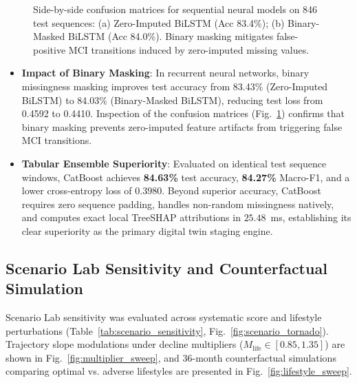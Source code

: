 \documentclass[11pt,a4paper]{article}
\begin{document}
\begin{figure}[t]
\centering
{}
\caption{Side-by-side confusion matrices for sequential neural models on 846 test sequences: (a) Zero-Imputed BiLSTM (Acc 83.4\%); (b) Binary-Masked BiLSTM (Acc 84.0\%). Binary masking mitigates false-positive MCI transitions induced by zero-imputed missing values.}
\label{fig:seq_cm_variants}
\end{figure}

\begin{itemize}
    \item \textbf{Impact of Binary Masking}: In recurrent neural networks, binary missingness masking improves test accuracy from 83.43\% (Zero-Imputed BiLSTM) to 84.03\% (Binary-Masked BiLSTM), reducing test loss from 0.4592 to 0.4410. Inspection of the confusion matrices (Fig.~\ref{fig:seq_cm_variants}) confirms that binary masking prevents zero-imputed feature artifacts from triggering false MCI transitions.
    \item \textbf{Tabular Ensemble Superiority}: Evaluated on identical test sequence windows, CatBoost achieves \textbf{84.63\%} test accuracy, \textbf{84.27\%} Macro-F1, and a lower cross-entropy loss of 0.3980. Beyond superior accuracy, CatBoost requires zero sequence padding, handles non-random missingness natively, and computes exact local TreeSHAP attributions in $25.48$~ms, establishing its clear superiority as the primary digital twin staging engine.
\end{itemize}

\subsection{Scenario Lab Sensitivity and Counterfactual Simulation}
\label{sec:results_scenario}
Scenario Lab sensitivity was evaluated across systematic score and lifestyle perturbations (Table~\ref{tab:scenario_sensitivity}, Fig.~\ref{fig:scenario_tornado}). Trajectory slope modulations under decline multipliers ($M_{\text{life}} \in [0.85, 1.35]$) are shown in Fig.~\ref{fig:multiplier_sweep}, and 36-month counterfactual simulations comparing optimal vs. adverse lifestyles are presented in Fig.~\ref{fig:lifestyle_sweep}.


\end{document}
